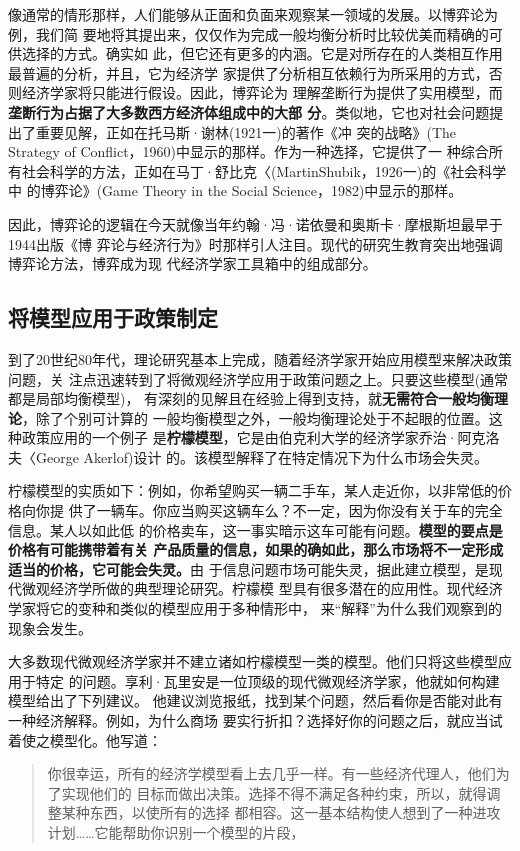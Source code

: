 像通常的情形那样，人们能够从正面和负面来观察某一领域的发展。以博弈论为例，我们简
要地将其提出来，仅仅作为完成一般均衡分析时比较优美而精确的可供选择的方式。确实如
此，但它还有更多的内涵。它是对所存在的人类相互作用最普遍的分析，并且，它为经济学
家提供了分析相互依赖行为所采用的方式，否则经济学家将只能进行假设。因此，博弈论为
理解垄断行为提供了实用模型，而\textbf{垄断行为占据了大多数西方经济体组成中的大部
  分}。类似地，它也对社会问题提出了重要见解，正如在托马斯·谢林(1921一)的著作《冲
突的战略》(The Strategy of Conflict，1960)中显示的那样。作为一种选择，它提供了一
种综合所有社会科学的方法，正如在马丁·舒比克〈(MartinShubik，1926一)的《社会科学中
的博弈论》(Game Theory in the Social Science，1982)中显示的那样。

因此，博弈论的逻辑在今天就像当年约翰·冯·诺依曼和奥斯卡·摩根斯坦最早于1944出版《博
弈论与经济行为》时那样引人注目。现代的研究生教育突出地强调博弈论方法，博弈成为现
代经济学家工具箱中的组成部分。

\subsection{将模型应用于政策制定}

到了20世纪80年代，理论研究基本上完成，随着经济学家开始应用模型来解决政策问题，关
注点迅速转到了将微观经济学应用于政策问题之上。只要这些模型(通常都是局部均衡模型)，
有深刻的见解且在经验上得到支持，就\textbf{无需符合一般均衡理论}，除了个别可计算的
一般均衡模型之外，一般均衡理论处于不起眼的位置。这种政策应用的一个例子
是\textbf{柠檬模型}，它是由伯克利大学的经济学家乔治·阿克洛夫〈George Akerlof)设计
的。该模型解释了在特定情况下为什么市场会失灵。

柠檬模型的实质如下：例如，你希望购买一辆二手车，某人走近你，以非常低的价格向你提
供了一辆车。你应当购买这辆车么？不一定，因为你没有关于车的完全信息。某人以如此低
的价格卖车，这一事实暗示这车可能有问题。\textbf{模型的要点是价格有可能携带着有关
  产品质量的信息，如果的确如此，那么市场将不一定形成适当的价格，它可能会失灵。}由
于信息问题市场可能失灵，据此建立模型，是现代微观经济学所做的典型理论研究。柠檬模
型具有很多潜在的应用性。现代经济学家将它的变种和类似的模型应用于多种情形中，
来“解释”为什么我们观察到的现象会发生。

大多数现代微观经济学家并不建立诸如柠檬模型一类的模型。他们只将这些模型应用于特定
的问题。享利·瓦里安是一位顶级的现代微观经济学家，他就如何构建模型给出了下列建议。
他建议浏览报纸，找到某个问题，然后看你是否能对此有一种经济解释。例如，为什么商场
要实行折扣？选择好你的问题之后，就应当试着使之模型化。他写道：
\begin{quotation}
  你很幸运，所有的经济学模型看上去几乎一样。有一些经济代理人，他们为了实现他们的
  目标而做出决策。选择不得不满足各种约束，所以，就得调整某种东西，以使所有的选择
  都相容。这一基本结构使人想到了一种进攻计划……它能帮助你识别一个模型的片段，
\end{quotation}

